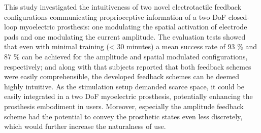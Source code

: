 This study investigated the intuitiveness of two novel electrotactile feedback configurations communicating proprioceptive information of a two DoF closed-loop myoelectric prosthesis: one modulating the spatial activation of electrode pads and one modulating the current amplitude. The evaluation tests showed that even with minimal training (< 30 minutes) a mean success rate of 93 \% and 87 \% can be achieved for the amplitude and spatial modulated configurations, respectively; and along with that subjects reported that both feedback schemes were easily comprehensible, the developed feedback schemes can be deemed highly intuitive. As the stimulation setup demanded scarce space, it could be easily integrated in a two DoF myoelectric prosthesis, potentially enhancing the prosthesis embodiment in users. Moreover, especially the amplitude feedback scheme had the potential to convey the prosthetic states even less discretely, which would further increase the naturalness of use. 